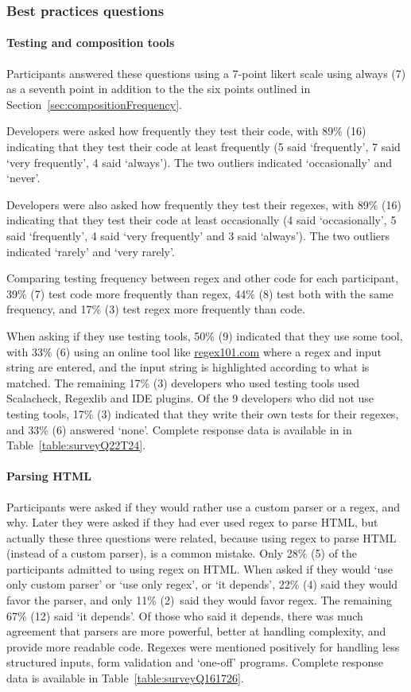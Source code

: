 

\subsubsection{Best practices questions}
\paragraph{Testing and composition tools} Participants answered these questions using a 7-point likert scale using always (7) as a seventh point in addition to the the six points outlined in Section~\ref{sec:compositionFrequency}.

Developers were asked how frequently they test their code, with 89\% (16) indicating that they test their code at least frequently (5 said `frequently', 7 said `very frequently', 4 said `always').  The two outliers indicated `occasionally' and `never'.

Developers were also asked how frequently they test their regexes, with 89\% (16) indicating that they test their code at least occasionally (4 said `occasionally', 5 said `frequently', 4 said `very frequently' and 3 said `always').  The two outliers indicated `rarely' and `very rarely'.

Comparing testing frequency between regex and other code for each participant, 39\% (7) test code more frequently than regex, 44\% (8) test both with the same frequency, and 17\% (3) test regex more frequently than code.

When asking if they use testing tools, 50\% (9) indicated that they use some tool, with 33\% (6) using an online tool like \url{regex101.com} where a regex and input string are entered, and the input string is highlighted according to what is matched.  The remaining 17\% (3) developers who used testing tools used Scalacheck, Regexlib and IDE plugins.
Of the 9 developers who did not use testing tools, 17\% (3) indicated that they write their own tests for their regexes, and 33\% (6) answered `none'.  Complete response data is available in in Table~\ref{table:surveyQ22T24}.

\paragraph{Parsing HTML} Participants were asked if they would rather use a custom parser or a regex, and why.  Later they were asked if they had ever used regex to parse HTML, but actually these three questions were related, because using regex to parse HTML (instead of a custom parser), is a common mistake.
Only 28\% (5) of the participants admitted to using regex on HTML.  When asked if they would `use only custom parser' or `use only regex', or `it depends', 22\% (4) said they would favor the parser, and only 11\% (2) said they would favor regex.  The remaining 67\% (12) said `it depends'.  Of those who said it depends, there was much agreement that parsers are more powerful, better at handling complexity, and provide more readable code.  Regexes were mentioned positively for handling less structured inputs, form validation and `one-off' programs.  Complete response data is available in Table~\ref{table:surveyQ161726}.




